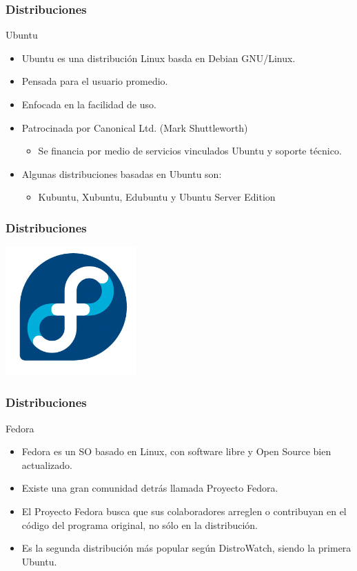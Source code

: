 \frame
{
\frametitle{Distribuciones}
\Large{Ubuntu}
\normalsize
\begin{itemize}
	\item Ubuntu es una distribución Linux basda en Debian GNU/Linux.
	\item Pensada para el usuario promedio.
	\item Enfocada en la facilidad de uso.
	\item Patrocinada por Canonical Ltd. (Mark Shuttleworth)
	 \begin{itemize}
	 	\item Se financia por medio de servicios vinculados Ubuntu y soporte técnico.
	 \end{itemize}
	\item Algunas distribuciones basadas en Ubuntu son:
	\begin{itemize}
		\item Kubuntu, Xubuntu, Edubuntu y Ubuntu Server Edition
	\end{itemize}
\end{itemize}
}

\frame
{
\frametitle{Distribuciones}
\begin{center}
	\includegraphics[width=5cm]{img/fedora}
\end{center}
}

\frame
{
\frametitle{Distribuciones}
\Large{Fedora}
\normalsize
\begin{itemize}
	\item Fedora es un SO basado en Linux, con software libre y Open Source bien actualizado.
	\item Existe una gran comunidad detrás llamada Proyecto Fedora.
	\item El Proyecto Fedora busca que sus colaboradores arreglen o contribuyan en el código del programa original, no sólo en la distribución.
	\item Es la segunda distribución más popular según DistroWatch, siendo la primera Ubuntu. 
\end{itemize}
}

